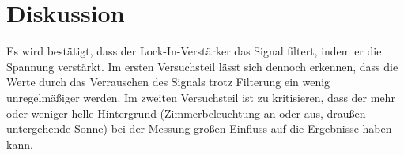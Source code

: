 \section{Diskussion}
\label{sec:Diskussion}
Es wird bestätigt, dass der Lock-In-Verstärker das Signal filtert, indem er die Spannung verstärkt. 
Im ersten Versuchsteil lässt sich dennoch erkennen, dass die Werte durch das Verrauschen des Signals trotz Filterung ein wenig unregelmäßiger werden. 
Im zweiten Versuchsteil ist zu kritisieren, dass der mehr oder weniger helle Hintergrund (Zimmerbeleuchtung an oder aus, draußen untergehende Sonne) bei der Messung großen Einfluss auf die Ergebnisse haben kann.